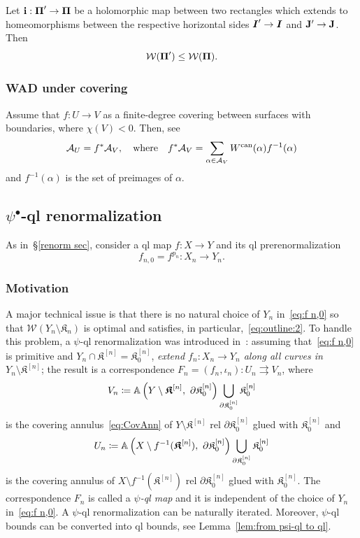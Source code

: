 \documentclass{amsart}
\newcommand{\bfilled}{{\boldsymbol{\mathfrak K} }}
\newcommand{\filled}{{\mathfrak K }}
\newcommand{\can}{{\operatorname{can}}}
\renewcommand{\sp}{{\ \ }}
\newcommand{\1}{{\mathbb 1 }}
\newcommand{\Width}{{\mathcal W}}
\renewcommand{\AA}{{\mathcal A}}
\begin{document}
\begin{lem}\label{tranform rule for rectangles}
   Let ${\mathbf{i}}: {\boldsymbol{\Pi}}'\rightarrow {\boldsymbol{\Pi}}$ be a holomorphic map between two rectangles
which extends to homeomorphisms between the respective  horizontal  sides
${\boldsymbol{I}}'\rightarrow {\boldsymbol{I}}$ and ${\mathbf{J}}'\rightarrow {\mathbf{J}}$. Then
$$
      {\mathcal W}(  {\boldsymbol{\Pi}}' ) \leq {\mathcal W} ( {\boldsymbol{\Pi}} ). 
$$ 
\end{lem}

\subsubsection{WAD under covering}
\label{sss:WAD:cov}

Assume that $f \colon U\to V$ as a finite-degree covering between surfaces with boundaries, where $\chi(V)<0$. Then, see~\cite[Lemma 3.3]{K}
\begin{equation}
\AA_U=f^*\AA_V, \sp \text{ where }\sp  f^*\AA_V=\sum_{\alpha \in \AA_V} \Weight^\can(\alpha) f^{-1}(\alpha) 
\end{equation}
and $ f^{-1}(\alpha)$ is the set of preimages of $\alpha$.




\subsection{$\psi^\bullet$-ql renormalization}\label{psi-renorm} As in~\S\ref{renorm sec}, consider a ql map $f\colon X\to Y$ and its ql prerenormalization 
\begin{equation}
\label{eq:f n,0}
f_{n,0}=f^{p_n}\colon X_n\to Y_n.
\end{equation}


\subsubsection{Motivation}
\label{sss:psi renorm: motiv}
A major technical issue is that there is no natural choice of $Y_n$ in~\eqref{eq:f n,0} so that ${\Width (Y_n\setminus \filled_n)}$ is optimal and satisfies, in particular,~\eqref{eq:outline:2}. To handle this problem, a $\psi$-ql renormalization was introduced in~\cite{K}: assuming that~\eqref{eq:f n,0} is primitive and $Y_n\cap \bfilled ^{[n]}=\filled^{[n]}_0$, \emph{extend $f_n\colon X_n \to Y_n$ along all curves in $Y_n\setminus \bfilled^{[n]}$}; the result is a correspondence $F_n=(f_n,\iota_n)\colon U_n\rightrightarrows V_n$, where
\[V_n\coloneqq \A\left(Y\setminus \bfilled^{[n]}, \ \partial \filled^{[n]}_0\right) \bigcup _{\partial \filled^{[n]}_0} \filled^{[n]}_0\] is the covering annulus~\eqref{eq:CovAnn} of $Y\setminus \bfilled^{[n]}$ rel $\partial \filled^{[n]}_0$ glued with $\filled^{[n]}_0$ and 
\[U_n\coloneqq \A\left( X\setminus f^{-1}(\bfilled^{[n]}), \ \partial \filled^{[n]}_0\right) \bigcup _{\partial \filled^{[n]}_0} \filled^{[n]}_0\] 
is the covering annulus of $X\setminus f^{-1}\left(\bfilled^{[n]}\right)$ rel $\partial \filled^{[n]}_0$ glued with $\filled^{[n]}_0$. The correspondence $F_n$ is called a \emph{$\psi$-ql map} and it is independent of the choice of $Y_n$ in~\eqref{eq:f n,0}.  A $\psi$-ql renormalization can be naturally iterated. Moreover, $\psi$-ql bounds can be converted into ql bounds, see Lemma~\ref{lem:from psi-ql to ql}.
\end{document}

